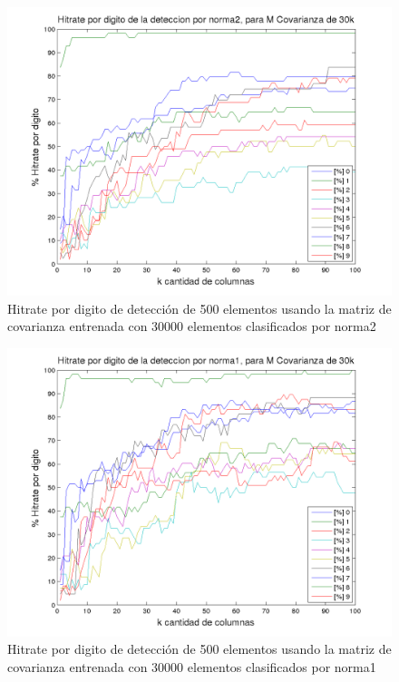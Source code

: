 \begin{figure}[H]
\begin {center}
\includegraphics[width=\pdwidth]{plots/pordig-30kcv-norma2.png}
\end {center}
\caption{Hitrate por digito de detecci\'on de 500 elementos usando la matriz de covarianza entrenada con 30000 elementos
clasificados por norma2}
\label{fig:HRD30kcv-n2}
\end{figure}

\begin{figure}[H]
\begin {center}
\includegraphics[width=\pdwidth]{plots/pordig-30kcv-norma1.png}
\end {center}
\caption{Hitrate por digito de detecci\'on de 500 elementos usando la matriz de covarianza entrenada con 30000 elementos
clasificados por norma1}
\label{fig:HRD30kcv-n1}
\end{figure}

